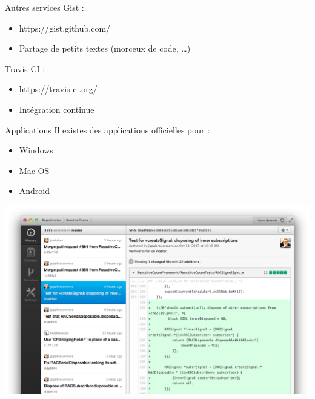 \begin{frame}{Autres services}
Gist :
\begin{itemize}
	\item https://gist.github.com/
	\item Partage de petits textes (morceux de code, …)
\end{itemize}

Travis CI :
\begin{itemize}
	\item https://travis-ci.org/
	\item Intégration continue
\end{itemize}
\end{frame}

\begin{frame}{Applications}
Il existes des applications officielles pour :
\begin{itemize}
	\item Windows
	\item Mac OS
	\item Android
\end{itemize}
\begin{center}
\includegraphics[scale=0.3]{screen1.png}
\end{center}
\end{frame}

